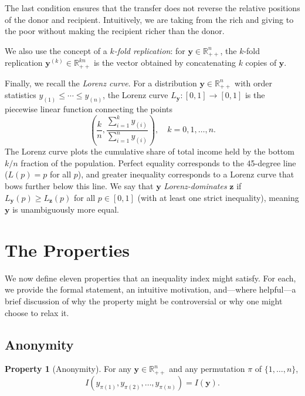 \documentclass[12pt]{article}
\theoremstyle{plain}
\theoremstyle{definition}
\newtheorem{axiom}{Property}
\theoremstyle{remark}
\newcommand{\R}{\mathbb{R}}
\newcommand{\bfy}{\mathbf{y}}
\newcommand{\bfz}{\mathbf{z}}
\begin{document}
The last condition ensures that the transfer does not reverse the relative positions of the donor and recipient.
Intuitively, we are taking from the rich and giving to the poor without making the recipient richer than the donor.

We also use the concept of a \emph{$k$-fold replication}: for $\bfy \in \R_{++}^n$, the $k$-fold replication $\bfy^{(k)} \in \R_{++}^{kn}$ is the vector obtained by concatenating $k$ copies of $\bfy$.

Finally, we recall the \emph{Lorenz curve}.
For a distribution $\bfy \in \R_{++}^n$ with order statistics $y_{(1)} \leq \cdots \leq y_{(n)}$, the Lorenz curve $L_{\bfy} : [0, 1] \to [0, 1]$ is the piecewise linear function connecting the points
\begin{equation}
\left(\frac{k}{n}, \frac{\sum_{i=1}^k y_{(i)}}{\sum_{i=1}^n y_{(i)}}\right), \quad k = 0, 1, \ldots, n.
\end{equation}
The Lorenz curve plots the cumulative share of total income held by the bottom $k/n$ fraction of the population.
Perfect equality corresponds to the 45-degree line ($L(p) = p$ for all $p$), and greater inequality corresponds to a Lorenz curve that bows further below this line.
We say that $\bfy$ \emph{Lorenz-dominates} $\bfz$ if $L_{\bfy}(p) \geq L_{\bfz}(p)$ for all $p \in [0, 1]$ (with at least one strict inequality), meaning $\bfy$ is unambiguously more equal.

\section{The Properties}\label{sec:properties}

We now define eleven properties that an inequality index might satisfy.
For each, we provide the formal statement, an intuitive motivation, and---where helpful---a brief discussion of why the property might be controversial or why one might choose to relax it.

\subsection{Anonymity}\label{sec:anonymity}

\begin{axiom}[Anonymity]\label{ax:anon}
For any $\bfy \in \R_{++}^n$ and any permutation $\pi$ of $\{1, \ldots, n\}$,
\begin{equation}
I(y_{\pi(1)}, y_{\pi(2)}, \ldots, y_{\pi(n)}) = I(\bfy).
\end{equation}
\end{axiom}
\end{document}

